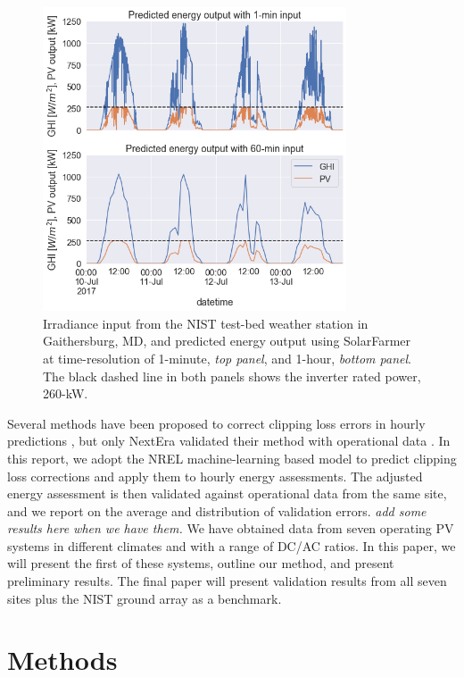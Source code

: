 \documentclass[conference]{IEEEtran}
\begin{document}
\begin{figure}[htbp]
\centerline{\includegraphics[width=9cm]{hourly_v_1-min_clipping.png}}
\caption{Irradiance input from the NIST test-bed weather station in Gaithersburg, MD, and predicted energy output using SolarFarmer at time-resolution of 1-minute, \textit{top panel}, and 1-hour, \textit{bottom panel}. The black dashed line in both panels shows the inverter rated power, 260-kW.}
\label{fig:irradiance-and-power}
\end{figure}

Several methods have been proposed to correct clipping loss errors in hourly predictions \cite{Cormode2019,Kharait,Anderson2020,Bradford}, but only NextEra validated their method with operational data \cite{Bradford}. In this report, we adopt the NREL machine-learning based model \cite{Anderson2020} to predict clipping loss corrections and apply them to hourly energy assessments. The adjusted energy assessment is then validated against operational data from the same site, and we report on the average and distribution of validation errors. \textit{\color{red}add some results here when we have them.} We have obtained data from seven operating PV systems in different climates and with a range of DC/AC ratios. In this paper, we will present the first of these systems, outline our method, and present preliminary results. The final paper will present validation results from all seven sites plus the NIST ground array \cite{Boyd2017b} as a benchmark.

\section{Methods}
\end{document}

